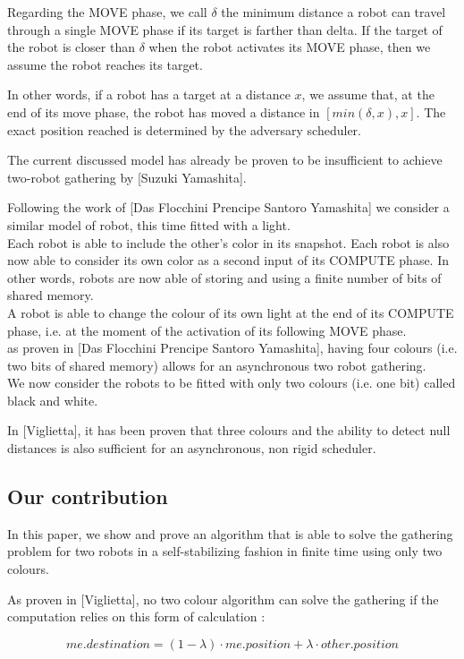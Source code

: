 \documentclass[11pt]{article}
\begin{document}
Regarding the MOVE phase, we call $\delta$ the minimum distance a robot can travel through a single MOVE phase if its target is farther than delta. If the target of the robot is closer than $\delta$ when the robot activates its MOVE phase, then we assume the robot reaches its target.

In other words, if a robot has a target at a distance $x$, we assume that, at the end of its move phase, the robot has moved a distance in $[min(\delta,x),x]$. The exact position reached is determined by the adversary scheduler.

The current discussed model has already be proven to be insufficient to achieve two-robot gathering by [Suzuki Yamashita].

Following the work of [Das Flocchini Prencipe Santoro Yamashita] we consider a similar model of robot, this time fitted with a light.
\\
Each robot is able to include the other's color in its snapshot. Each robot is also now able to consider its own color as a second input of its COMPUTE phase. In other words, robots are now able of storing and using a finite number of bits of shared memory.
\\
A robot is able to change the colour of its own light at the end of its COMPUTE phase, i.e. at the moment of the activation of its following MOVE phase.
\\
as proven in [Das Flocchini Prencipe Santoro Yamashita], having four colours (i.e. two bits of shared memory) allows for an asynchronous two robot gathering.
\\
We now consider the robots to be fitted with only two colours (i.e. one bit) called black and white.

In [Viglietta], it has been proven that three colours and the ability to detect null distances is also sufficient for an asynchronous, non rigid scheduler.

\subsection{Our contribution}

In this paper, we show and prove an algorithm that is able to solve the gathering problem for two robots in a self-stabilizing fashion in finite time using only two colours.

As proven in [Viglietta], no two colour algorithm can solve the gathering if the computation relies on this form of calculation :

$$ me.destination = (1-\lambda ) \cdot me.position + \lambda \cdot other.position $$
\end{document}
